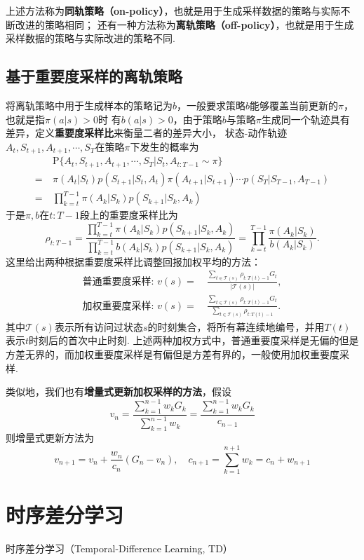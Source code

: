 \documentclass[12pt, a4paper, oneside]{ctexart}
\numberwithin{equation}{section}  %
\def\P{\mathbb{P}}          %
\def\P{\mathrm{P}}            %
\begin{document}
上述方法称为\textbf{同轨策略（on-policy）}，也就是用于生成采样数据的策略与实际不断改进的策略相同；
还有一种方法称为\textbf{离轨策略（off-policy）}，也就是用于生成采样数据的策略与实际改进的策略不同.

\subsection{基于重要度采样的离轨策略}
将离轨策略中用于生成样本的策略记为$b$，一般要求策略$b$能够覆盖当前更新的$\pi$，也就是指$\pi(a|s) > 0$时
有$b(a|s) > 0$，由于策略$b$与策略$\pi$生成同一个轨迹具有差异，定义\textbf{重要度采样比}来衡量二者的差异大小，
状态-动作轨迹$A_t,S_{t+1},A_{t+1},\cdots, S_{T}$在策略$\pi$下发生的概率为
\begin{align*}
    &\ \P\{A_t,S_{t+1},A_{t+1},\cdots, S_{T}|S_t, A_{t:T-1}\sim \pi\}\\
    =&\ \pi(A_t|S_t)p(S_{t+1}|S_t,A_t)\pi(A_{t+1}|S_{t+1})\cdots p(S_T|S_{T-1},A_{T-1})\\
    =&\ \prod_{k=t}^{T-1}\pi(A_k|S_k)p(S_{k+1}|S_k,A_k)
\end{align*}
于是$\pi,b$在$t:T-1$段上的重要度采样比为
\begin{equation*}
    \rho_{t:T-1} = \frac{\prod_{k=t}^{T-1}\pi(A_k|S_k)p(S_{k+1}|S_k,A_k)}{\prod_{k=t}^{T-1}b(A_k|S_k)p(S_{k+1}|S_k,A_k)} = 
    \prod_{k=t}^{T-1}\frac{\pi(A_k|S_k)}{b(A_k|S_k)}.
\end{equation*}
这里给出两种根据重要度采样比调整回报加权平均的方法：
\begin{align*}
    \text{普通重要度采样: }v(s) =&\ \frac{\sum_{t\in\mathcal{T}(s)}\rho_{t:T(t)-1}G_t}{|\mathcal{T}(s)|},\\
    \text{加权重要度采样: }v(s) =&\ \frac{\sum_{t\in\mathcal{T}(s)}\rho_{t:T(t)-1}G_t}{\sum_{t\in\mathcal{T}(s)}\rho_{t:T(t)-1}}.
\end{align*}
其中$\mathcal{T}(s)$表示所有访问过状态$s$的时刻集合，将所有幕连续地编号，并用$T(t)$表示$t$时刻后的首次中止时刻. 
上述两种加权方式中，普通重要度采样是无偏的但是方差无界的，而加权重要度采样是有偏但是方差有界的，一般使用加权重要度采样.

类似地，我们也有\textbf{增量式更新加权采样的方法}，假设
\begin{equation*}
    v_n = \frac{\sum_{k=1}^{n-1}w_kG_k}{\sum_{k=1}^{n-1}w_k} =\frac{\sum_{k=1}^{n-1}w_kG_k}{c_{n-1}}
\end{equation*}
则增量式更新方法为
\begin{equation*}
    v_{n+1} = v_n + \frac{w_n}{c_n}(G_n - v_n),\quad c_{n+1} = \sum_{k=1}^{n+1}w_k = c_n + w_{n+1}
\end{equation*}
\section{时序差分学习}
时序差分学习（Temporal-Difference Learning, TD）
\end{document}
